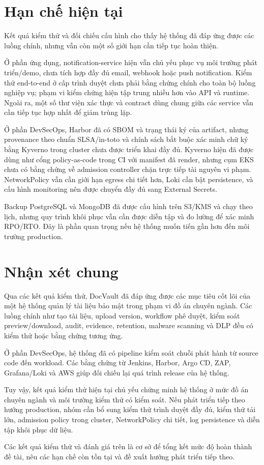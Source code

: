\section{Hạn chế hiện tại}
\label{sec:limitations}

Kết quả kiểm thử và đối chiếu cấu hình cho thấy hệ thống đã đáp ứng được các luồng chính, nhưng vẫn còn một số giới hạn cần tiếp tục hoàn thiện.

Ở phần ứng dụng, notification-service hiện vẫn chủ yếu phục vụ môi trường phát triển/demo, chưa tích hợp đầy đủ email, webhook hoặc push notification. Kiểm thử end-to-end ở cấp trình duyệt chưa phải bằng chứng chính cho toàn bộ luồng nghiệp vụ; phạm vi kiểm chứng hiện tập trung nhiều hơn vào API và runtime. Ngoài ra, một số thư viện xác thực và contract dùng chung giữa các service vẫn cần tiếp tục hợp nhất để giảm trùng lặp.

Ở phần DevSecOps, Harbor đã có SBOM và trạng thái ký của artifact, nhưng provenance theo chuẩn SLSA/in-toto và chính sách bắt buộc xác minh chữ ký bằng Kyverno trong cluster chưa được triển khai đầy đủ. Kyverno hiện đã được dùng như cổng policy-as-code trong CI với manifest đã render, nhưng cụm EKS chưa có bằng chứng về admission controller chặn trực tiếp tài nguyên vi phạm. NetworkPolicy vẫn cần giới hạn egress chi tiết hơn, Loki cần bật persistence, và cấu hình monitoring nên được chuyển đầy đủ sang External Secrets.

Backup PostgreSQL và MongoDB đã được cấu hình trên S3/KMS và chạy theo lịch, nhưng quy trình khôi phục vẫn cần được diễn tập và đo lường để xác minh RPO/RTO. Đây là phần quan trọng nếu hệ thống muốn tiến gần hơn đến môi trường production.

\section{Nhận xét chung}

Qua các kết quả kiểm thử, DocVault đã đáp ứng được các mục tiêu cốt lõi của một hệ thống quản lý tài liệu bảo mật trong phạm vi đồ án chuyên ngành. Các luồng chính như tạo tài liệu, upload version, workflow phê duyệt, kiểm soát preview/download, audit, evidence, retention, malware scanning và DLP đều có kiểm thử hoặc bằng chứng tương ứng.

Ở phần DevSecOps, hệ thống đã có pipeline kiểm soát chuỗi phát hành từ source code đến workload. Các bằng chứng từ Jenkins, Harbor, Argo CD, ZAP, Grafana/Loki và AWS giúp đối chiếu lại quá trình release của hệ thống.

Tuy vậy, kết quả kiểm thử hiện tại chủ yếu chứng minh hệ thống ở mức đồ án chuyên ngành và môi trường kiểm thử có kiểm soát. Nếu phát triển tiếp theo hướng production, nhóm cần bổ sung kiểm thử trình duyệt đầy đủ, kiểm thử tải lớn, admission policy trong cluster, NetworkPolicy chi tiết, log persistence và diễn tập khôi phục dữ liệu.

Các kết quả kiểm thử và đánh giá trên là cơ sở để tổng kết mức độ hoàn thành đề tài, nêu các hạn chế còn tồn tại và đề xuất hướng phát triển tiếp theo.
